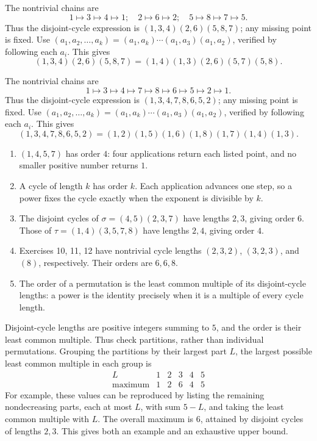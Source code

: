  The nontrivial chains are\[1\mapsto3\mapsto4\mapsto1;\quad 2\mapsto6\mapsto2;\quad 5\mapsto8\mapsto7\mapsto5.\]Thus the disjoint-cycle expression is $(1,3,4)(2,6)(5,8,7)$; any missing point is fixed.
 Use $(a_1,a_2,\ldots,a_k)=(a_1,a_k)\cdots(a_1,a_3)(a_1,a_2)$, verified by following each $a_i$. This gives\[(1,3,4)(2,6)(5,8,7)=(1,4)(1,3)(2,6)(5,7)(5,8).\]

 The nontrivial chains are\[1\mapsto3\mapsto4\mapsto7\mapsto8\mapsto6\mapsto5\mapsto2\mapsto1.\]Thus the disjoint-cycle expression is $(1,3,4,7,8,6,5,2)$; any missing point is fixed.
 Use $(a_1,a_2,\ldots,a_k)=(a_1,a_k)\cdots(a_1,a_3)(a_1,a_2)$, verified by following each $a_i$. This gives\[(1,3,4,7,8,6,5,2)=(1,2)(1,5)(1,6)(1,8)(1,7)(1,4)(1,3).\]

\begin{enumerate}[label=(\alph*)]
\item $(1,4,5,7)$ has order $4$: four applications return each listed point, and no smaller positive number returns $1$.
\item A cycle of length $k$ has order $k$. Each application advances one step, so a power fixes the cycle exactly when the exponent is divisible by $k$.
\item The disjoint cycles of $\sigma=(4,5)(2,3,7)$ have lengths $2,3$, giving order $6$. Those of $\tau=(1,4)(3,5,7,8)$ have lengths $2,4$, giving order $4$.
\item Exercises 10, 11, 12 have nontrivial cycle lengths $(2,3,2)$, $(3,2,3)$, and $(8)$, respectively. Their orders are $6,6,8$.
\item The order of a permutation is the least common multiple of its disjoint-cycle lengths: a power is the identity precisely when it is a multiple of every cycle length.
\end{enumerate}

\idea Disjoint-cycle lengths are positive integers summing to $5$, and the order is their least common multiple. Thus check partitions, rather than individual permutations.
Grouping the partitions by their largest part $L$, the largest possible least common multiple in each group is\[\begin{array}{c|rrrrr}L&1&2&3&4&5\\\hline \text{maximum}&1&2&6&4&5\end{array}\]For example, these values can be reproduced by listing the remaining nondecreasing parts, each at most $L$, with sum $5-L$, and taking the least common multiple with $L$. The overall maximum is $6$, attained by disjoint cycles of lengths $2,3$. This gives both an example and an exhaustive upper bound.


